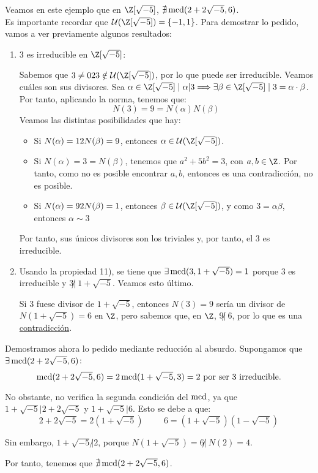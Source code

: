 \begin{ejemplo}
    Veamos en este ejemplo que en $\Z[\sqrt{-5}]$, $\nexists \operatorname{mcd}(2+2\sqrt{-5}, 6)$.\\

    Es importante recordar que $\cc{U}(\Z[\sqrt{-5}]) = \{-1, 1\}$. Para demostrar lo pedido, vamos a ver previamente algunos resultados:
    \begin{enumerate}
        \item $3$ es irreducible en $\Z[\sqrt{-5}]$:

        Sabemos que $3\neq0 \y 3 \notin \cc{U}(\Z[\sqrt{-5}])$, por lo que puede ser irreducible. Veamos cuáles son sus divisores. Sea $\alpha \in \Z[\sqrt{-5}] \mid \alpha|3 \Longrightarrow \exists \beta \in \Z[\sqrt{-5}] \mid 3=\alpha \cdot \beta$. Por tanto, aplicando la norma, tenemos que:
        $$N(3) = 9 =  N(\alpha)N(\beta)$$
        Veamos las distintas posibilidades que hay:
        \begin{itemize}
            \item Si $N(\alpha)=1 2 N(\beta) = 9$, entonces $\alpha \in \cc{U}(\Z[\sqrt{-5}])$.
            \item Si $N(\alpha) = 3 = N(\beta)$, tenemos que $a^2+5b^2=3$, con $a,b\in \Z$. Por tanto, como no es posible encontrar $a,b$, entonces es una contradicción, no es posible.
            \item Si $N(\alpha)=9 2 N(\beta) = 1$, entonces $\beta \in \cc{U}(\Z[\sqrt{-5}])$, y como $3=\alpha\beta$, entonces $\alpha\sim 3$
        \end{itemize}
        Por tanto, sus únicos divisores son los triviales y, por tanto, el $3$ es irreducible.

        \item Usando la propiedad 11), se tiene que $\exists \operatorname{mcd}(3, 1+\sqrt{-5})=1$ porque $3$ es irreducible y $3\not|~1+\sqrt{-5}$. Veamos esto último.

        Si $3$ fuese divisor de $1+\sqrt{-5}$, entonces $N(3)=9$ sería un divisor de $N(1+\sqrt{-5})=6$ en $\Z$, pero sabemos que, en $\Z$, $9\not|~6$, por lo que es una \ul{contradicción}.
    \end{enumerate}

    Demostramos ahora lo pedido mediante reducción al absurdo. Supongamos que $\exists \operatorname{mcd}(2+2\sqrt{-5}, 6)$:
    $$\operatorname{mcd}(2+2\sqrt{-5},6)=2\operatorname{mcd}(1+\sqrt{-5}, 3)=2 \text{ por ser $3$ irreducible.}$$

    No obstante, no verifica la segunda condición del $\operatorname{mcd}$, ya que $1+\sqrt{-5}|2+2\sqrt{-5}$ y $1+\sqrt{-5}|6$. Esto se debe a que:
    \begin{equation*}
        2+2\sqrt{-5} = 2(1+\sqrt{-5}) \hspace{1cm} 6=(1+\sqrt{-5})(1-\sqrt{-5})
    \end{equation*}
    
    Sin embargo, $1+\sqrt{-5}\not|2$, porque $N(1+\sqrt{-5})=6\not|~N(2)=4$.
    
    Por tanto, tenemos que $\nexists \operatorname{mcd}(2+2\sqrt{-5},6)$.
\end{ejemplo}

